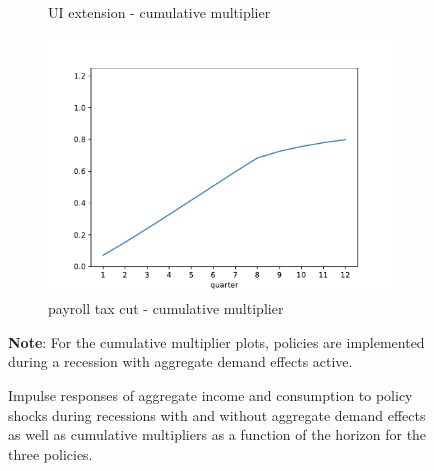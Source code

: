 \begin{figure}[htb]
\begin{subfigure}[b]{.33\linewidth}
		\caption{UI extension - cumulative multiplier}
		\label{fig:recessionuirelrecession_Mult}
	\end{subfigure}%
	\begin{subfigure}[b]{.33\linewidth}
		\centering
		\includegraphics[width=\linewidth]{text/chapter3/Code/HA-Models/FromPandemicCode/Figures/Cummulative_multiplier_TaxCut}
		\caption{payroll tax cut - cumulative multiplier}
		\label{fig:recessiontaxcutrelrecession_Mult}
	\end{subfigure}
	\caption{Impulse responses of aggregate income and consumption to policy shocks during recessions with and without aggregate demand effects as well as cumulative multipliers as a function of the horizon for the three policies. {\label{fig:Policyrelrecession}}}
	\parbox{16cm}{\small \vspace{.15cm} \textbf{Note}: For the cumulative multiplier plots, policies are implemented during a recession with aggregate demand effects active.\normalsize}
\end{figure}



